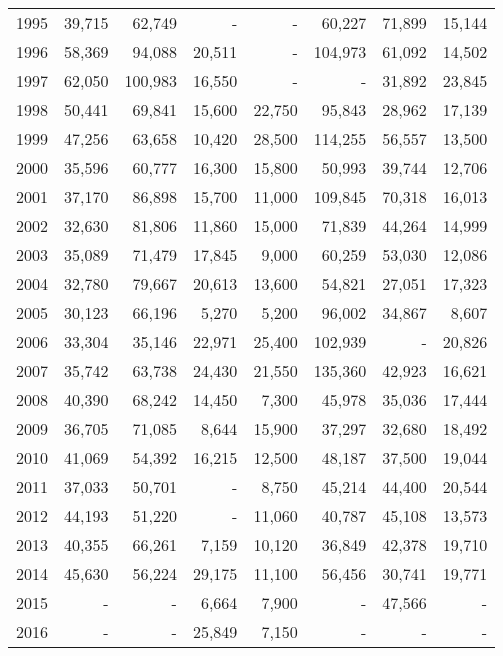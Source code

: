 \begin{longtable}{lrrrrrrr}
  1995 & 39,715 & 62,749 & - & - & 60,227 & 71,899 & 15,144 \\ 
  1996 & 58,369 & 94,088 & 20,511 & - & 104,973 & 61,092 & 14,502 \\ 
  1997 & 62,050 & 100,983 & 16,550 & - & - & 31,892 & 23,845 \\ 
  1998 & 50,441 & 69,841 & 15,600 & 22,750 & 95,843 & 28,962 & 17,139 \\ 
  1999 & 47,256 & 63,658 & 10,420 & 28,500 & 114,255 & 56,557 & 13,500 \\ 
  2000 & 35,596 & 60,777 & 16,300 & 15,800 & 50,993 & 39,744 & 12,706 \\ 
  2001 & 37,170 & 86,898 & 15,700 & 11,000 & 109,845 & 70,318 & 16,013 \\ 
  2002 & 32,630 & 81,806 & 11,860 & 15,000 & 71,839 & 44,264 & 14,999 \\ 
  2003 & 35,089 & 71,479 & 17,845 & 9,000 & 60,259 & 53,030 & 12,086 \\ 
  2004 & 32,780 & 79,667 & 20,613 & 13,600 & 54,821 & 27,051 & 17,323 \\ 
  2005 & 30,123 & 66,196 & 5,270 & 5,200 & 96,002 & 34,867 & 8,607 \\ 
  2006 & 33,304 & 35,146 & 22,971 & 25,400 & 102,939 & - & 20,826 \\ 
  2007 & 35,742 & 63,738 & 24,430 & 21,550 & 135,360 & 42,923 & 16,621 \\ 
  2008 & 40,390 & 68,242 & 14,450 & 7,300 & 45,978 & 35,036 & 17,444 \\ 
  2009 & 36,705 & 71,085 & 8,644 & 15,900 & 37,297 & 32,680 & 18,492 \\ 
  2010 & 41,069 & 54,392 & 16,215 & 12,500 & 48,187 & 37,500 & 19,044 \\ 
  2011 & 37,033 & 50,701 & - & 8,750 & 45,214 & 44,400 & 20,544 \\ 
  2012 & 44,193 & 51,220 & - & 11,060 & 40,787 & 45,108 & 13,573 \\ 
  2013 & 40,355 & 66,261 & 7,159 & 10,120 & 36,849 & 42,378 & 19,710 \\ 
  2014 & 45,630 & 56,224 & 29,175 & 11,100 & 56,456 & 30,741 & 19,771 \\ 
  2015 & - & - & 6,664 & 7,900 & - & 47,566 & - \\ 
  2016 & - & - & 25,849 & 7,150 & - & - & - \\ 
   \hline
\hline
\end{longtable}
\endgroup
